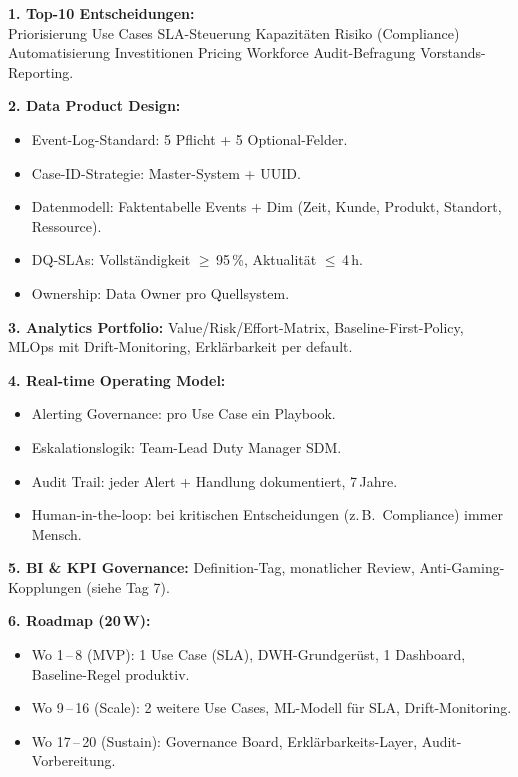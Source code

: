 \documentclass[11pt,a4paper,oneside]{article}
\begin{document}
\begin{loesungbox}
\textbf{1. Top-10 Entscheidungen:}\\
Priorisierung Use Cases \textperiodcentered{} SLA-Steuerung \textperiodcentered{} Kapazit\"aten \textperiodcentered{} Risiko (Compliance) \textperiodcentered{} Automatisierung \textperiodcentered{} Investitionen \textperiodcentered{} Pricing \textperiodcentered{} Workforce \textperiodcentered{} Audit-Befragung \textperiodcentered{} Vorstands-Reporting.

\smallskip
\textbf{2. Data Product Design:}
\begin{itemize}
  \item Event-Log-Standard: 5 Pflicht + 5 Optional-Felder.
  \item Case-ID-Strategie: Master-System + UUID.
  \item Datenmodell: Faktentabelle Events + Dim (Zeit, Kunde, Produkt, Standort, Ressource).
  \item DQ-SLAs: Vollst\"andigkeit $\geq$\,95\,\%, Aktualit\"at $\leq$\,4\,h.
  \item Ownership: Data Owner pro Quellsystem.
\end{itemize}

\smallskip
\textbf{3. Analytics Portfolio:} Value/Risk/Effort-Matrix, Baseline-First-Policy, MLOps mit Drift-Monitoring, Erkl\"arbarkeit per default.

\smallskip
\textbf{4. Real-time Operating Model:}
\begin{itemize}
  \item Alerting Governance: pro Use Case ein Playbook.
  \item Eskalations\-logik: Team-Lead \textrightarrow{} Duty Manager \textrightarrow{} SDM.
  \item Audit Trail: jeder Alert + Handlung dokumentiert, 7\,Jahre.
  \item Human-in-the-loop: bei kritischen Entscheidungen (z.\,B.\ Compliance) immer Mensch.
\end{itemize}

\smallskip
\textbf{5. BI \& KPI Governance:} Definition-Tag, monatlicher Review, Anti-Gaming-Kopplungen (siehe Tag 7).

\smallskip
\textbf{6. Roadmap (20\,W):}
\begin{itemize}
  \item Wo 1\,--\,8 (MVP): 1 Use Case (SLA), DWH-Grundger\"ust, 1 Dashboard, Baseline-Regel produktiv.
  \item Wo 9\,--\,16 (Scale): 2 weitere Use Cases, ML-Modell f\"ur SLA, Drift-Monitoring.
  \item Wo 17\,--\,20 (Sustain): Governance Board, Erkl\"arbarkeits-Layer, Audit-Vorbereitung.
\end{itemize}


\end{loesungbox}
\end{document}
